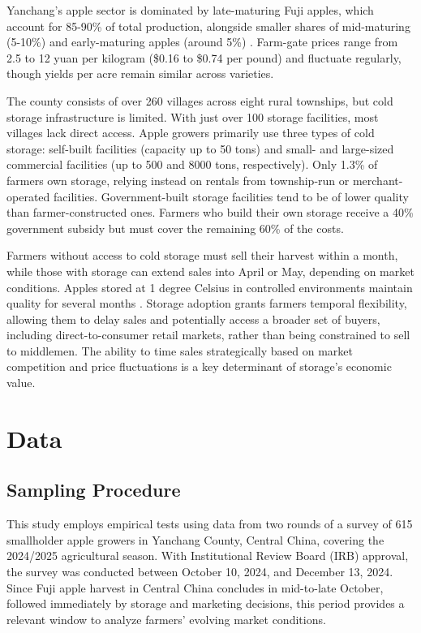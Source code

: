 Yanchang's apple sector is dominated by late-maturing Fuji apples, which account for 85-90\% of total production, alongside smaller shares of mid-maturing (5-10\%) and early-maturing apples (around 5\%) \citep{yanchang2023}. Farm-gate prices range from 2.5 to 12 yuan per kilogram (\$0.16 to \$0.74 per pound) and fluctuate regularly, though yields per acre remain similar across varieties.  

The county consists of over 260 villages across eight rural townships, but cold storage infrastructure is limited. With just over 100 storage facilities, most villages lack direct access. Apple growers primarily use three types of cold storage: self-built facilities (capacity up to 50 tons) and small- and large-sized commercial facilities (up to 500 and 8000 tons, respectively). Only 1.3\% of farmers own storage, relying instead on rentals from township-run or merchant-operated facilities. Government-built storage facilities tend to be of lower quality than farmer-constructed ones. Farmers who build their own storage receive a 40\% government subsidy but must cover the remaining 60\% of the costs.  

Farmers without access to cold storage must sell their harvest within a month, while those with storage can extend sales into April or May, depending on market conditions. Apples stored at 1 degree Celsius in controlled environments maintain quality for several months \citep{Varela2005Shelf-life, Echeverria2004Relationships}. Storage adoption grants farmers temporal flexibility, allowing them to delay sales and potentially access a broader set of buyers, including direct-to-consumer retail markets, rather than being constrained to sell to middlemen. The ability to time sales strategically based on market competition and price fluctuations is a key determinant of storage's economic value.  



\section{Data}
\subsection{Sampling Procedure}
\noindent This study employs empirical tests using data from two rounds of a survey of 615 smallholder apple growers in Yanchang County, Central China, covering the 2024/2025 agricultural season. With Institutional Review Board (IRB) approval, the survey was conducted between October 10, 2024, and December 13, 2024. Since Fuji apple harvest in Central China concludes in mid-to-late October, followed immediately by storage and marketing decisions, this period provides a relevant window to analyze farmers' evolving market conditions.  

